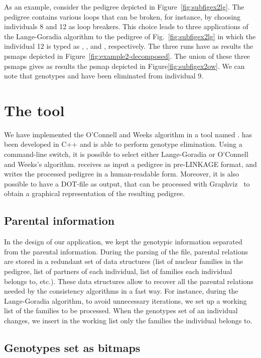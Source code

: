 As an example, consider the pedigree depicted in
Figure~\ref{fig:subfigex2lg}. The pedigree contains various loops that can be
broken, for instance, by choosing individuals 8 and 12 as loop breakers. This
choice leads to three applications of the Lange-Goradia algorithm to the
pedigree of Fig.~\ref{fig:subfigex2lg} in which the individual 12 is typed as
, , and , respectively. The three runs have as results the
psmaps depicted in Figure~\ref{fig:example2-decomposed}. The union of these
three psmaps gives as results the psmap depicted in
Figure\ref{fig:subfigex2ow}. We can note that genotypes  and  have
been eliminated from individual 9. 

\section{The {\TheTool} tool}
\label{sec:imple}

We have implemented the O'Connell and Weeks algorithm in  a tool named
\TheTool. {\TheTool} has been developed in C++ and is able to perform genotype
elimination. Using a command-line switch, it is possible to select either Lange-Goradia
or O'Connell and Weeks's algorithm. {\TheTool} receives as input a pedigree in
pre-LINKAGE format, and writes the processed pedigree in a human-readable
form. Moreover, it is also possible to have a DOT-file as output, that can be
processed with Graphviz~\cite{graphviz} to obtain a graphical representation of
the resulting pedigree.

\subsection{Parental information}
\label{sec:pedigr-data-struct}
In the design of our application, we kept the genotypic information separated 
from the parental information. During the parsing of the file, 
parental relations are stored in a redundant set of data structures (list of nuclear families in the
pedigree, list of partners of each individual, list of families each individual
belongs to, etc.). These data structures allow to recover all the parental
relations needed by the consistency algorithms in a fast way. For instance,
during the Lange-Goradia algorithm, to avoid unnecessary iterations, we set up a
working list of the families to be processed. When the genotypes set of an individual
changes, we insert in the working list only the families the individual belongs
to. 

\subsection{Genotypes set as bitmaps}
\label{sec:genotypes-set-as}

